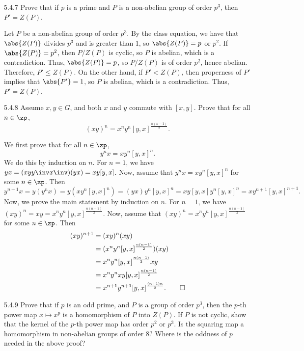 \begin{exercise}{5.4.7}
    Prove that if $p$ is a prime and $P$ is a non-abelian group of order $p^3$, then $P' = Z(P)$.
\end{exercise}

\begin{sol}
    Let $P$ be a non-abelian group of order $p^3$.
	By the class equation, we have that $\abs{Z(P)}$ divides $p^3$ and is greater than 1, so $\abs{Z(P)} = p$ or $p^2$.
	If $\abs{Z(P)} = p^2$, then $P/Z(P)$ is cyclic, so $P$ is abelian, which is a contradiction.
	Thus, $\abs{Z(P)} = p$, so $P/Z(P)$ is of order $p^2$, hence abelian.
	Therefore, $P' \leq Z(P)$.
	On the other hand, if $P' < Z(P)$, then properness of $P'$ implies that $\abs{P'} = 1$, so $P$ is abelian, which is a contradiction.
	Thus, $P' = Z(P)$.
\end{sol}

\begin{exercise}{5.4.8}
    Assume $x, y \in G$, and both $x$ and $y$ commute with $[x, y]$.
	Prove that for all $n \in \zp$,
    \[
    	(xy)^n = x^n y^n [y, x]^{\frac{n(n-1)}{2}}.
    \]
\end{exercise}

\begin{sol}
    We first prove that for all $n \in \zp$,
    \[
    	y^nx = xy^n [y, x]^n.
    \]
    We do this by induction on $n$.
	For $n = 1$, we have $yx = (xyy\inv x\inv)(yx) = xy[y, x]$.
	Now, assume that $y^nx = xy^n [y, x]^n$ for some $n \in \zp$.
	Then
    \[
    	y^{n+1}x = y(y^nx) = y(xy^n [y, x]^n) = (yx)y^n [y, x]^n = xy[y, x]y^n [y, x]^n = xy^{n+1} [y, x]^{n+1}.
    \]
    Now, we prove the main statement by induction on $n$.
	For $n = 1$, we have $(xy)^n = xy = x^n y^n [y, x]^{\frac{n(n-1)}{2}}$.
	Now, assume that $(xy)^n = x^n y^n [y, x]^{\frac{n(n-1)}{2}}$ for some $n \in \zp$.
	Then
    \begin{align*}
        (xy)^{n+1} & = (xy)^n (xy) \\
        & = (x^n y^n [y, x]^{\frac{n(n-1)}{2}})(xy) \\
        & = x^n y^n [y, x]^{\frac{n(n-1)}{2}} x y \\
        & = x^n y^n x y [y, x]^{\frac{n(n-1)}{2}} \\
        & = x^{n+1} y^{n+1} [y, x]^{\frac{(n+1)n}{2}}. \qedhere
    \end{align*}
\end{sol}

\begin{exercise}{5.4.9}
    Prove that if $p$ is an odd prime, and $P$ is a group of order $p^3$, then the $p$-th power map $x \mapsto x^p$ is a homomorphism of $P$ into $Z(P)$.
	If $P$ is not cyclic, show that the kernel of the $p$-th power map has order $p^2$ or $p^3$.
	Is the squaring map a homomorphism in non-abelian groups of order 8?
	Where is the oddness of $p$ needed in the above proof?
\end{exercise}

